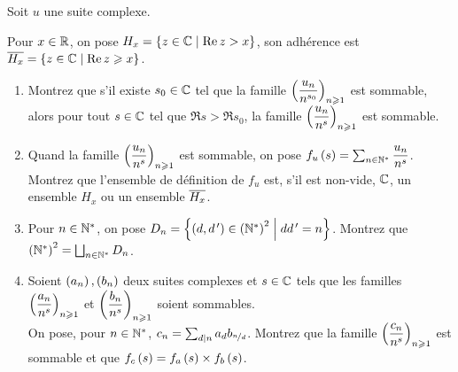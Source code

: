 \begin{corr}
\end{corr}

\begin{exoss}[Exercice 29]
Soit \(u\) une suite complexe.

Pour \(x\in\mathbb{R}\), on pose \(H_x=\left\lbrace z\in\mathbb{C}\;\middle|\;\operatorname{Re} z>x\right\rbrace\), son adhérence est \(\overline{H_x}=\left\lbrace z\in\mathbb{C}\;\middle|\;\operatorname{Re} z\geqslant x\right\rbrace\).

\begin{enumerate}
    \item Montrez que s'il existe \(s_0\in\mathbb{C}\) tel que la famille \(\left(\dfrac{u_n}{n^{s_0}}\right)_{n\geqslant1}\) est sommable, alors pour tout \(s\in\mathbb{C}\) tel que \(\Re s>\Re s_0\), la famille \(\left(\dfrac{u_n}{n^s}\right)_{n\geqslant1}\) est sommable. \\
    \item Quand la famille \(\left(\dfrac{u_n}{n^s}\right)_{n\geqslant1}\) est sommable, on pose \(f_u\left(s\right)=\sum_{n\in\mathbb{N}^*}\dfrac{u_n}{n^s}\). \\ Montrez que l'ensemble de définition de \(f_u\) est, s'il est non-vide, \(\mathbb{C}\), un ensemble \(H_x\) ou un ensemble \(\overline{H_x}\). \\
    \item Pour \(n\in\mathbb{N}^*\), on pose \(D_n=\left\lbrace\left(d,d^{\,\prime}\right)\in\left(\mathbb{N}^*\right)^2\;\middle|\; dd^{\,\prime}=n\right\rbrace\). Montrez que \(\left(\mathbb{N}^*\right)^2=\bigsqcup_{n\in\mathbb{N}^*}D_n\). \\
    \item Soient \(\left(a_n\right),\left(b_n\right)\) deux suites complexes et \(s\in\mathbb{C}\) tels que les familles \(\left(\dfrac{a_n}{n^s}\right)_{n\geqslant1}\) et \(\left(\dfrac{b_n}{n^s}\right)_{n\geqslant1}\) soient sommables. \\ On pose, pour \(n\in\mathbb{N}^*\), \(c_n=\sum_{d\mid n}a_db_{\nicefrac{n}{d}}\). Montrez que la famille \(\left(\dfrac{c_n}{n^s}\right)_{n\geqslant1}\) est sommable et que \(f_c\left(s\right)=f_a\left(s\right)\times f_b\left(s\right)\).
\end{enumerate}
\end{exoss}

\begin{corr}
\end{corr}


